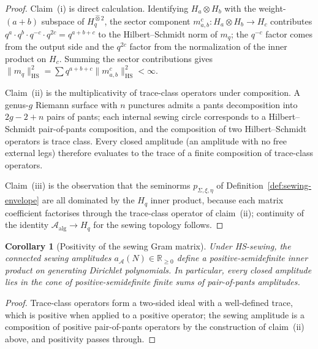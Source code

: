 \documentclass[11pt,reqno]{amsart}
\newtheorem{corollary}[theorem]{Corollary}
\theoremstyle{definition}
\theoremstyle{remark}
\newcommand{\cA}{\mathcal{A}}
\newcommand{\HS}{\mathrm{HS}}
\numberwithin{equation}{section}
\begin{document}
\begin{proof}
Claim~(i) is direct calculation. Identifying $H_a \otimes H_b$
with the weight-$(a+b)$ subspace of $H_q^{\widehat{\otimes} 2}$,
the sector component $m_{a,b}^c \colon H_a \otimes H_b \to H_c$
contributes
$q^a \cdot q^b \cdot q^{-c} \cdot q^{2c}
= q^{a+b+c}$ to the Hilbert--Schmidt norm of $m_q$; the $q^{-c}$
factor comes from the output side and the $q^{2c}$ factor from
the normalization of the inner product on $H_c$. Summing the
sector contributions gives
$\|m_q\|_{\HS}^2 = \sum q^{a+b+c} \|m_{a,b}^c\|_{\HS}^2 < \infty$.

Claim~(ii) is the multiplicativity of trace-class operators under
composition. A genus-$g$ Riemann surface with $n$ punctures
admits a pants decomposition into $2g - 2 + n$ pairs of pants;
each internal sewing circle corresponds to a Hilbert--Schmidt
pair-of-pants composition, and the composition of two
Hilbert--Schmidt operators is trace class. Every closed amplitude
(an amplitude with no free external legs) therefore evaluates to
the trace of a finite composition of trace-class operators.

Claim~(iii) is the observation that the seminorms
$p_{\Sigma,\xi,\eta}$ of Definition~\ref{def:sewing-envelope} are
all dominated by the $H_q$ inner product, because each matrix
coefficient factorises through the trace-class operator of
claim~(ii); continuity of the identity
$\cA_{\mathrm{alg}} \to H_q$ for the sewing topology follows.
\end{proof}

\begin{corollary}[Positivity of the sewing Gram matrix]
\label{cor:hs-positivity}
Under HS-sewing, the connected sewing amplitudes
$a_\cA(N) \in \mathbb{R}_{\geq 0}$ define a positive-semidefinite
inner product on generating Dirichlet polynomials. In particular,
every closed amplitude lies in the cone of positive-semidefinite
finite sums of pair-of-pants amplitudes.
\end{corollary}

\begin{proof}
Trace-class operators form a two-sided ideal with a well-defined
trace, which is positive when applied to a positive operator; the
sewing amplitude is a composition of positive pair-of-pants
operators by the construction of claim~(ii) above, and positivity
passes through.
\end{proof}

\end{document}
